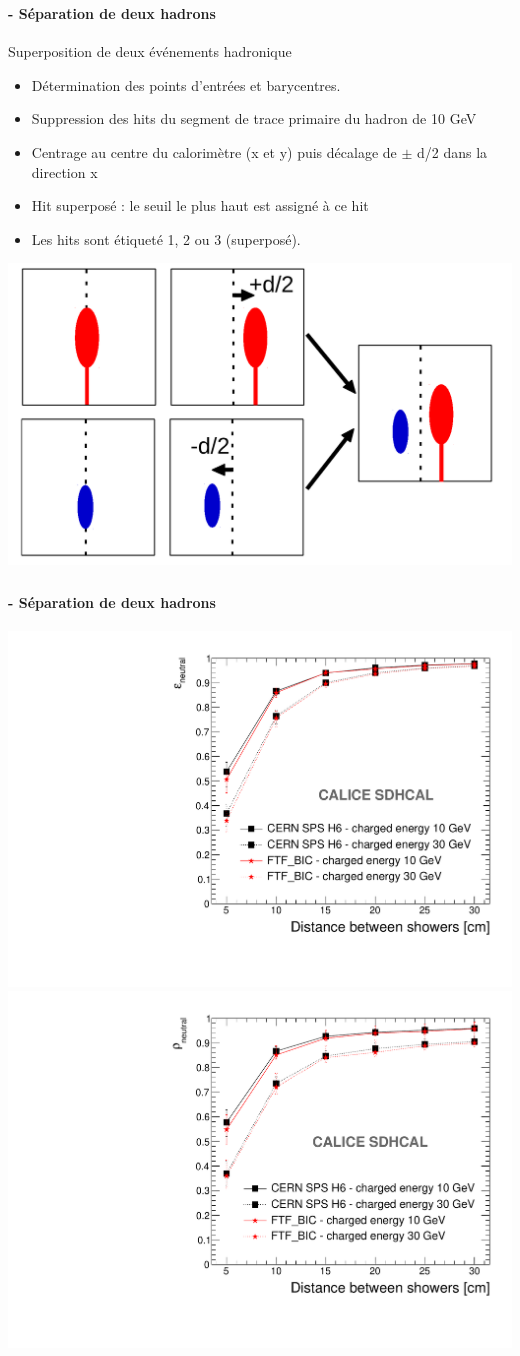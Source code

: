 \documentclass[8pt]{beamer}
\begin{document}
  \begin{frame}
  \frametitle{\secname}
  \framesubtitle{\subsecname - Séparation de deux hadrons}
    \begin{block}{Superposition de deux événements hadronique}
      \begin{itemize}
        \item Détermination des points d'entrées et barycentres.
        \item Suppression des hits du segment de trace primaire du hadron de 10 GeV
        \item Centrage au centre du calorimètre (x et y) puis décalage de $\pm$ d/2 dans la direction x
        \item Hit superposé : le seuil le plus haut est assigné à ce hit
        \item Les hits sont étiqueté 1, 2 ou 3 (superposé).
      \end{itemize}
    \end{block}
    \begin{center}
      \includegraphics[width=0.65\linewidth]{OverlayEvent.pdf}
    \end{center}
  \end{frame}


  \begin{frame}
  \frametitle{\secname}
  \framesubtitle{\subsecname - Séparation de deux hadrons}
    \begin{center}
      \includegraphics[width=0.49\linewidth]{OverlayEvent_Efficiency.pdf}
      \includegraphics[width=0.49\linewidth]{OverlayEvent_Purity.pdf}
    \end{center}
  \end{frame}
\end{document}
